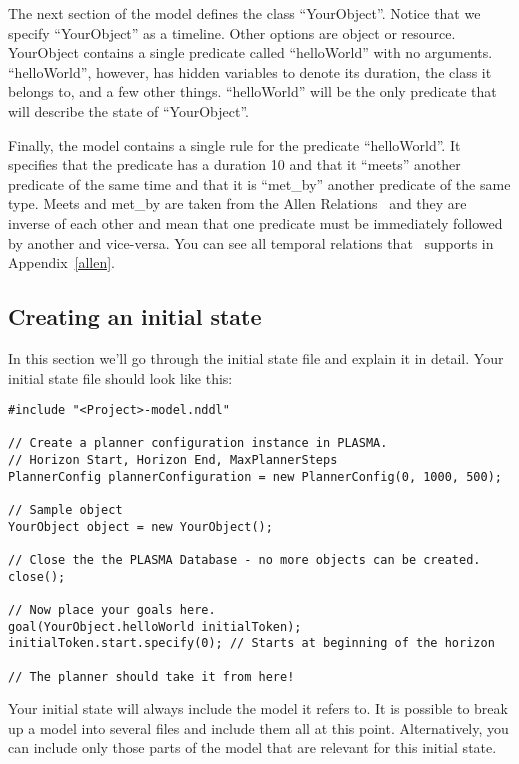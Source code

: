 \documentclass[10pt, letterpaper, twoside]{article}
\begin{document}
The next section of the model defines the class ``YourObject''.  Notice
that we specify ``YourObject'' as a timeline.  Other options are object or
resource.  YourObject contains a single predicate called ``helloWorld''
with no arguments.  ``helloWorld'', however, has hidden variables to
denote its duration, the class it belongs to, and a few other
things. ``helloWorld'' will be the only predicate that will describe the 
state of ``YourObject''.

Finally, the model contains a single rule for the predicate
``helloWorld''.  It specifies that the predicate has a duration 10 and that
it ``meets'' another predicate of the same time and that it is ``met\_by''
another predicate of the same type.  Meets and met\_by are taken from the
Allen Relations~\cite{allen} and they are inverse of each other and mean
that one predicate must be immediately followed by another and vice-versa.
You can see all temporal relations that \ET\, supports in Appendix~\ref{allen}.

\subsection{Creating an initial state}
\label{initial}
In this section we'll go through the initial state file and explain it in
detail. Your initial state file should look like this:

\begin{verbatim}
#include "<Project>-model.nddl"

// Create a planner configuration instance in PLASMA.
// Horizon Start, Horizon End, MaxPlannerSteps
PlannerConfig plannerConfiguration = new PlannerConfig(0, 1000, 500);

// Sample object
YourObject object = new YourObject();

// Close the the PLASMA Database - no more objects can be created.
close();

// Now place your goals here.
goal(YourObject.helloWorld initialToken);
initialToken.start.specify(0); // Starts at beginning of the horizon

// The planner should take it from here!
\end{verbatim}

Your initial state will always include the model it refers to.  It is
possible to break up a model into several files and include them all at
this point.  Alternatively, you can include only those parts of the model
that are relevant for this initial state.
\end{document}
